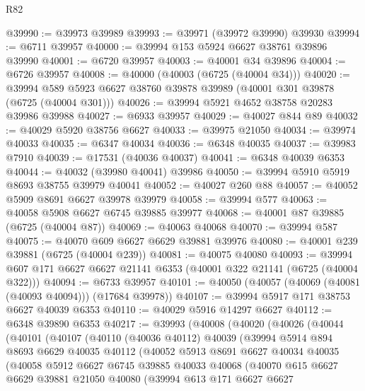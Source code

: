 \begin{lexlean}{R82}
\begin{coremodule}
@39990 := @39973 @39989
@39993 := @39971 (@39972 @39990) @39930
@39994 := @6711 @39957
@40000 := @39994 @153 @5924 @6627 @38761 @39896 @39990
@40001 := @6720 @39957
@40003 := @40001 @34 @39896
@40004 := @6726 @39957
@40008 := @40000 (@40003 (@6725 (@40004 @34)))
@40020 := @39994 @589 @5923 @6627 @38760 @39878 @39989 (@40001 @301 @39878 (@6725 (@40004 @301)))
@40026 := @39994 @5921 @4652 @38758 @20283 @39986 @39988
@40027 := @6933 @39957
@40029 := @40027 @844 @89
@40032 := @40029 @5920 @38756 @6627
@40033 := @39975 @21050
@40034 := @39974 @40033
@40035 := @6347 @40034
@40036 := @6348 @40035
@40037 := @39983 @7910
@40039 := @17531 (@40036 @40037)
@40041 := @6348 @40039 @6353
@40044 := @40032 (@39980 @40041) @39986
@40050 := @39994 @5910 @5919 @8693 @38755 @39979 @40041
@40052 := @40027 @260 @88
@40057 := @40052 @5909 @8691 @6627 @39978 @39979
@40058 := @39994 @577
@40063 := @40058 @5908 @6627 @6745 @39885 @39977
@40068 := @40001 @87 @39885 (@6725 (@40004 @87))
@40069 := @40063 @40068
@40070 := @39994 @587
@40075 := @40070 @609 @6627 @6629 @39881 @39976
@40080 := @40001 @239 @39881 (@6725 (@40004 @239))
@40081 := @40075 @40080
@40093 := @39994 @607 @171 @6627 @6627 @21141 @6353 (@40001 @322 @21141 (@6725 (@40004 @322)))
@40094 := @6733 @39957
@40101 := @40050 (@40057 (@40069 (@40081 (@40093 @40094))) (@17684 @39978))
@40107 := @39994 @5917 @171 @38753 @6627 @40039 @6353
@40110 := @40029 @5916 @14297 @6627
@40112 := @6348 @39890 @6353
@40217 := @39993
    (@40008
      (@40020
        (@40026
          (@40044
            (@40101
              (@40107
                (@40110
                  (@40036 @40112)
                  @40039
                  (@39994
                    @5914
                    @894
                    @8693
                    @6629
                    @40035
                    @40112
                    (@40052
                      @5913
                      @8691
                      @6627
                      @40034
                      @40035
                      (@40058
                        @5912
                        @6627
                        @6745
                        @39885
                        @40033
                        @40068
                        (@40070
                          @615
                          @6627
                          @6629
                          @39881
                          @21050
                          @40080
                          (@39994
                            @613
                            @171
                            @6627
                            @6627

\end{coremodule}
\end{lexlean}
